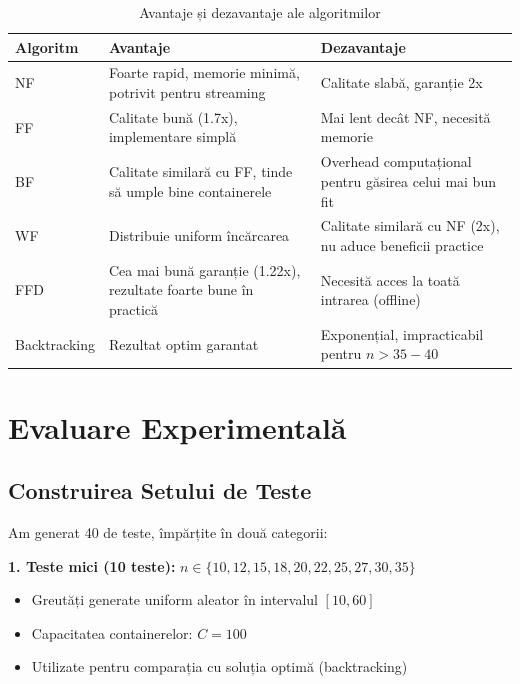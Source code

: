 \documentclass[runningheads]{llncs}
\begin{document}
\begin{table}[H]
\centering
\caption{Avantaje și dezavantaje ale algoritmilor}
\label{tab:advantages}
\begin{tabular}{|l|p{5.5cm}|p{5.5cm}|}
\hline
\textbf{Algoritm} & \textbf{Avantaje} & \textbf{Dezavantaje} \\
\hline
NF & Foarte rapid, memorie minimă, potrivit pentru streaming & Calitate slabă, garanție 2x \\
\hline
FF & Calitate bună (1.7x), implementare simplă & Mai lent decât NF, necesită memorie \\
\hline
BF & Calitate similară cu FF, tinde să umple bine containerele & Overhead computațional pentru găsirea celui mai bun fit \\
\hline
WF & Distribuie uniform încărcarea & Calitate similară cu NF (2x), nu aduce beneficii practice \\
\hline
FFD & Cea mai bună garanție (1.22x), rezultate foarte bune în practică & Necesită acces la toată intrarea (offline) \\
\hline
Backtracking & Rezultat optim garantat & Exponențial, impracticabil pentru $n > 35-40$ \\
\hline
\end{tabular}
\end{table}

\section{Evaluare Experimentală}

\subsection{Construirea Setului de Teste}

Am generat 40 de teste, împărțite în două categorii:

\textbf{1. Teste mici (10 teste):} $n \in \{10, 12, 15, 18, 20, 22, 25, 27, 30, 35\}$
\begin{itemize}
    \item Greutăți generate uniform aleator în intervalul $[10, 60]$
    \item Capacitatea containerelor: $C = 100$
    \item Utilizate pentru comparația cu soluția optimă (backtracking)
\end{itemize}
\end{document}
